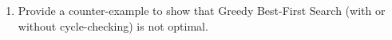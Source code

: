 \begin{listo}
\begin{listo}
\begin{enumerate}[label=\alph*)]
            \begin{solution}
                \begin{center}  \end{center}
            \end{solution}
            
            \item Provide a counter-example to show that Greedy Best-First Search (with or without cycle-checking) is not optimal.
        \end{enumerate}
    \end{listo}
\end{listo}